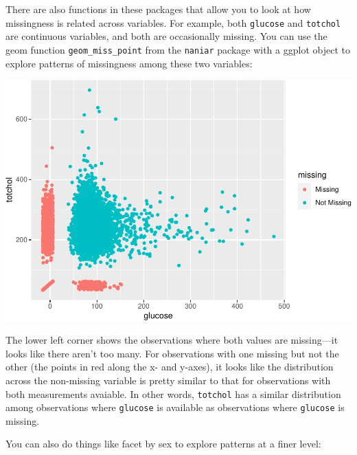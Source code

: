 \documentclass[
]{book}
\newenvironment{Shaded}{\begin{snugshade}}{\end{snugshade}}
\newcommand{\DataTypeTok}[1]{\textcolor[rgb]{0.13,0.29,0.53}{#1}}
\newcommand{\KeywordTok}[1]{\textcolor[rgb]{0.13,0.29,0.53}{\textbf{#1}}}
\newcommand{\NormalTok}[1]{#1}
\newcommand{\OperatorTok}[1]{\textcolor[rgb]{0.81,0.36,0.00}{\textbf{#1}}}
\newcommand{\StringTok}[1]{\textcolor[rgb]{0.31,0.60,0.02}{#1}}
\begin{document}
There are also functions in these packages that allow you to look at how
missingness is related across variables. For example, both \texttt{glucose} and
\texttt{totchol} are continuous variables, and both are occasionally missing. You
can use the geom function \texttt{geom\_miss\_point} from the \texttt{naniar} package
with a ggplot object to explore patterns of missingness among these two
variables:

\begin{Shaded}
\end{Shaded}

\includegraphics{adv_epi_analysis_files/figure-latex/unnamed-chunk-156-1.pdf}

The lower left corner shows the observations where both values are missing---it
looks like there aren't too many. For observations with one missing but not the
other (the points in red along the x- and y-axes), it looks like the distribution
across the non-missing variable is pretty similar to that for observations
with both measurements avaiable. In other words, \texttt{totchol} has a similar
distribution among observations where \texttt{glucose} is available as observations
where \texttt{glucose} is missing.

You can also do things like facet by sex to explore patterns at a finer level:
\end{document}
